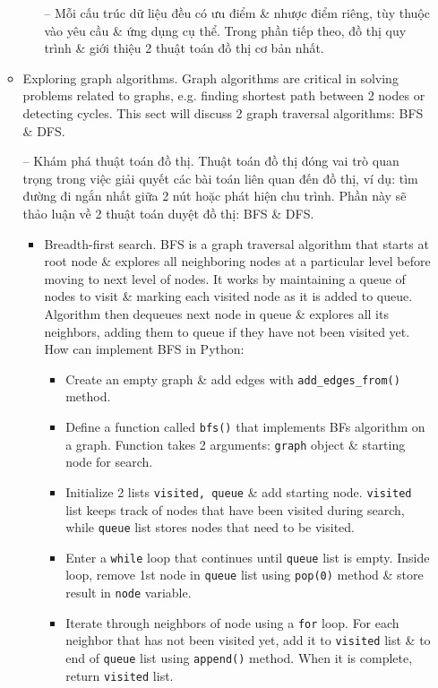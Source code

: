 \documentclass{article}
\begin{document}
\begin{itemize}
\begin{itemize}
\begin{itemize}
            -- Mỗi cấu trúc dữ liệu đều có ưu điểm \& nhược điểm riêng, tùy thuộc vào yêu cầu \& ứng dụng cụ thể. Trong phần tiếp theo, đồ thị quy trình \& giới thiệu 2 thuật toán đồ thị cơ bản nhất.
        \end{itemize}
        \item {\sf Exploring graph algorithms.} Graph algorithms are critical in solving problems related to graphs, e.g. finding shortest path between 2 nodes or detecting cycles. This sect will discuss 2 graph traversal algorithms: BFS \& DFS.

        -- {\sf Khám phá thuật toán đồ thị.} Thuật toán đồ thị đóng vai trò quan trọng trong việc giải quyết các bài toán liên quan đến đồ thị, ví dụ: tìm đường đi ngắn nhất giữa 2 nút hoặc phát hiện chu trình. Phần này sẽ thảo luận về 2 thuật toán duyệt đồ thị: BFS \& DFS.
        \begin{itemize}
            \item {\sf Breadth-first search.} BFS is a graph traversal algorithm that starts at root node \& explores all neighboring nodes at a particular level before moving to next level of nodes. It works by maintaining a queue of nodes to visit \& marking each visited node as it is added to queue. Algorithm then dequeues next node in queue \& explores all its neighbors, adding them to queue if they have not been visited yet. How can implement BFS in Python:
            \begin{itemize}
                \item Create an empty graph \& add edges with \verb|add_edges_from()| method.
                \item Define a function called {\tt bfs()} that implements BFs algorithm on a graph. Function takes 2 arguments: {\tt graph} object \& starting node for search.
                \item Initialize 2 lists {\tt visited, queue} \& add starting node. {\tt visited} list keeps track of nodes that have been visited during search, while {\tt queue} list stores nodes that need to be visited.
                \item Enter a {\tt while} loop that continues until {\tt queue} list is empty. Inside loop, remove 1st node in {\tt queue} list using {\tt pop(0)} method \& store result in {\tt node} variable.
                \item Iterate through neighbors of node using a {\tt for} loop. For each neighbor that has not been visited yet, add it to {\tt visited} list \& to end of {\tt queue} list using {\tt append()} method. When it is complete, return {\tt visited} list.

\end{itemize}
\end{itemize}
\end{itemize}
\end{itemize}
\end{document}

